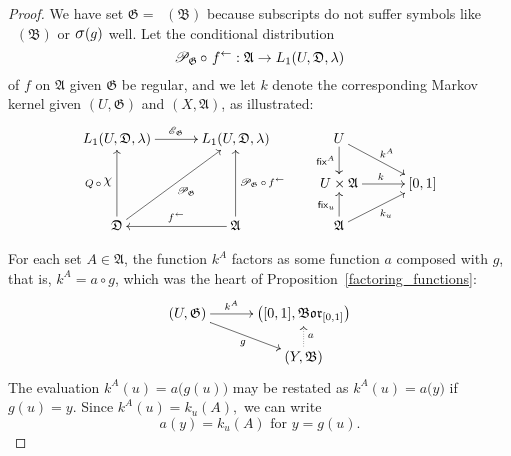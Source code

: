 \documentclass[
twoside=true,
paper=letter,
fontsize=9pt,
pagesize=auto,
leqno,
openany,
headsepline,
overfullrule,
]{scrbook}
\theoremstyle{plain}
\theoremstyle{plain}
\theoremstyle{definition}
\theoremstyle{bfnoteitalic}
\theoremstyle{bfnoteroman}
\newcommand{\sigalg}[1]{\mathfrak{#1}}
\newcommand{\cali}[1]{\mathscr{#1}}
\newcommand{\sfop}[1]{\mathsf{#1}}
\newcommand{\condexpop}[1]{\mathop{\cali{E}\hspace{-1pt}}\nolimits_{#1}}
\newcommand{\condprobop}[1]{\mathop{\cali{P}\hspace{-1pt}}\nolimits_{#1}}
\newcommand{\borel}{\mathfrak{Bor}}
\newcommand{\sagb}{\mathop{\hbox{\large{$\sigma$}}}\nolimits}
\newcommand{\charfunction}[1]{\mathop{{\raisebox{2pt}{$\chi$}}_{#1}}}
\newcommand{\preimage}[1]{\mathop{#1^{\leftarrow}}}
\newcommand{\sigmaalgebra}{\sigalg{A}}
\newcommand{\sigmaalgebraii}{\sigalg{B}}
\newcommand{\funca}{a}
\newcommand{\funcg}{g}
\newcommand{\funck}{k}
\newcommand{\function}{f}
\newcommand{\measurespace}{X}
\newcommand{\measurespaceii}{Y}
\newcommand{\mspaceeltii}{y}
\newcommand{\measureiii}{\lambda}
\newcommand{\seti}{A}
\newcommand{\fixinthefirst}[1]{\sfop{fix}_{#1}}
\newcommand{\fixinthesecond}[1]{\sfop{fix}^{#1}}
\newcommand{\uspace}{U}%
\newcommand{\uspaceelt}{u}
\newcommand{\uspacesig}{\sigalg{D}}
\begin{document}
\begin{proof}
We have set
$\sigalg{G} = \preimage{\funcg}(\sigmaalgebraii)$ because
subscripts do not suffer symbols like
$\preimage{\funcg}(\sigmaalgebraii)$ or $\sagb(\funcg)$
well.
Let the conditional distribution
\[
\condprobop{\sigalg{G}}\circ\, \preimage{\function}:
\sigmaalgebra \to L_1(\uspace,\uspacesig,\measureiii)
\]
of $\function$ on $\sigmaalgebra$ given $\sigalg{G}$
be regular, and we let
$\funck$
denote the corresponding Markov kernel given
$(\uspace,\sigalg{G})$ and $(\measurespace,\sigmaalgebra)$, as illustrated:
\[
\xymatrix@R=16pt@C=30pt{
L_1(\uspace, \uspacesig, \measureiii) \ar[r]^{\condexpop{\sigalg{G}}}
& L_1(\uspace, \uspacesig, \measureiii)
& \uspace
\ar[d]_-{\fixinthesecond{\seti}}
\ar[dr]^{\funck^\seti}
\\
&
& \uspace\times\sigmaalgebra \ar[r]^{\funck}
& [0,1]
\\
\uspacesig
\ar[uu]^{Q\,\circ\,\charfunction{}}
\ar[uur]_{\condprobop{\sigalg{G}}}
& \sigmaalgebra
\ar[uu]_{\condprobop{\sigalg{G}}\circ \preimage{\function}}
\ar[l]_{\preimage{\function}}
& \sigmaalgebra
\ar[u]^{\fixinthefirst{\uspaceelt}}
\ar[ur]_{\funck_\uspaceelt}
&
\\
}
\]

For each set $\seti\in\sigmaalgebra$, the function
$\funck^\seti$ factors as some function $\funca$ composed with $\funcg$,
that is, $\funck^\seti= \funca \circ \funcg$,
which was the heart of Proposition~\ref{factoring_functions}:
\[
\xymatrix@R=14pt@C=30pt{
(\uspace,\sigalg{G})
\ar[r]^-{\funck^\seti}
\ar[dr]_{\funcg}
& \bigl([0,1],\borel_{[0,1]}\bigr) \\
 & (\measurespaceii,\sigmaalgebraii) \ar@{.>}[u]_{\funca}\\
}
\]
The evaluation
$\funck^\seti(\uspaceelt)
=
a\bigl(\funcg(\uspaceelt)\bigr)$
may be restated as
$\funck^\seti(\uspaceelt)
=
a\bigl(\mspaceeltii)$
if
$\funcg(\uspaceelt)
=
\mspaceeltii$.
Since $\funck^\seti(\uspaceelt) = \funck_\uspaceelt(\seti),$
we can write
\[
a(\mspaceeltii)=\funck_\uspaceelt(\seti) \text{ for } \mspaceeltii = \funcg(\uspaceelt).
\]


\end{proof}
\end{document}
